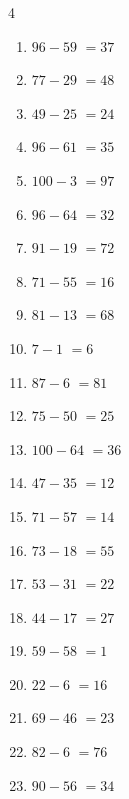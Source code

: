 \begin{multicols}{4}
\begin{enumerate}
\columnbreak %

  \item $96-59$
        $=37$

  \item $77-29$
        $=48$

  \item $49-25$
        $=24$

  \item $96-61$
        $=35$

  \item $100-3$
        $=97$

  \item $96-64$
        $=32$

  \item $91-19$
        $=72$

  \item $71-55$
        $=16$

  \item $81-13$
        $=68$

  \item $7-1$
        $=6$

  \item $87-6$
        $=81$

  \item $75-50$
        $=25$

  \item $100-64$
        $=36$

  \item $47-35$
        $=12$

  \item $71-57$
        $=14$

  \item $73-18$
        $=55$

  \item $53-31$
        $=22$

  \item $44-17$
        $=27$

  \item $59-58$
        $=1$

  \item $22-6$
        $=16$

  \item $69-46$
        $=23$

  \item $82-6$
        $=76$

  \item $90-56$
        $=34$


\end{enumerate}
\end{multicols}
